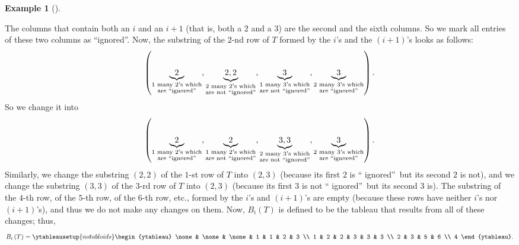 \documentclass[numbers=enddot,12pt,final,onecolumn,notitlepage]{scrartcl}%
\theoremstyle{definition}
\newtheorem{exmp}[theo]{Example}
\newenvironment{example}[1][]
{\begin{exmp}[#1]\begin{leftbar}}
{\end{leftbar}\end{exmp}}
\begin{document}
\begin{example}
The columns that contain both an $i$ and an $i+1$ (that is, both a $2$ and a
$3$) are the second and the sixth columns. So we mark all entries of these two
columns as \textquotedblleft ignored\textquotedblright. Now, the substring of
the $2$-nd row of $T$ formed by the $i$'s and the $\left(  i+1\right)  $'s
looks as follows:%
\[
\left(  \underbrace{2}_{\substack{1\text{ many }2\text{'s which}\\\text{are
\textquotedblleft ignored\textquotedblright}}},\underbrace{2,2}%
_{\substack{2\text{ many }2\text{'s which}\\\text{are not \textquotedblleft
ignored\textquotedblright}}},\underbrace{3}_{\substack{1\text{ many }3\text{'s
which}\\\text{are not \textquotedblleft ignored\textquotedblright}%
}},\underbrace{3}_{\substack{2\text{ many }3\text{'s which}\\
\text{are \textquotedblleft ignored\textquotedblright}}}\right)  .
\]
So we change it into%
\[
\left(  \underbrace{2}_{\substack{1\text{ many }2\text{'s which}\\\text{are
\textquotedblleft ignored\textquotedblright}}},\underbrace{2}%
_{\substack{1\text{ many }2\text{'s which}\\\text{are not \textquotedblleft
ignored\textquotedblright}}},\underbrace{3,3}_{\substack{2\text{ many
}3\text{'s which}\\\text{are not \textquotedblleft ignored\textquotedblright}%
}},\underbrace{3}_{\substack{2\text{ many }3\text{'s which}\\
\text{are \textquotedblleft ignored\textquotedblright}}}\right)  .
\]
Similarly, we change the substring $\left(  2,2\right)  $ of the $1$-st row of
$T$ into $\left(  2,3\right)  $ (because its first $2$ is \textquotedblleft
ignored\textquotedblright\ but its second $2$ is not), and we change the
substring $\left(  3,3\right)  $ of the $3$-rd row of $T$ into $\left(
2,3\right)  $ (because its first $3$ is not \textquotedblleft
ignored\textquotedblright\ but its second $3$ is). The substring of the $4$-th
row, of the $5$-th row, of the $6$-th row, etc., formed by the $i$'s and
$\left(  i+1\right)  $'s are empty (because these rows have neither $i$'s nor
$\left(  i+1\right)  $'s), and thus we do not make any changes on them. Now,
$B_{i}\left(  T\right)  $ is defined to be the tableau that results from all
of these changes; thus,%
\[
B_{i}\left(  T\right)  =%
\ytableausetup{notabloids}
\begin{ytableau}
\none& \none& \none& 1 & 1 & 2 & 3 \\
1 & 2 & 2 & 3 & 3 & 3 \\
2 & 3 & 5 & 6 \\
4
\end{ytableau}%
.
\]

\end{example}
\end{document}
